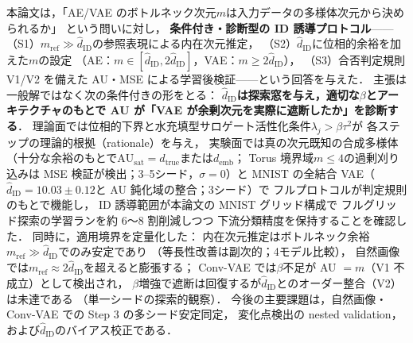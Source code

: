 \documentclass[11pt,a4paper]{jsarticle}
\newcommand{\hatdID}{\hat{d}_{\mathrm{ID}}}
\newcommand{\dtrue}{d_{\mathrm{true}}}
\newcommand{\AUsat}{\mathrm{AU}_{\mathrm{sat}}}
\newcommand{\demb}{d_{\mathrm{emb}}}
\begin{document}
本論文は，「AE/VAE のボトルネック次元$m$は入力データの多様体次元から決められるか」
という問いに対し，
\textbf{条件付き・診断型の ID 誘導プロトコル}——
（S1）$m_{\mathrm{ref}} \gg \hatdID$の参照表現による内在次元推定，
（S2）$\hatdID$に位相的余裕を加えた$m$の設定
（AE：$m \in [\hatdID, 2\hatdID]$，VAE：$m \geq 2\hatdID$），
（S3）合否判定規則 V1/V2 を備えた AU・MSE による学習後検証——という回答を与えた．
主張は一般解ではなく次の条件付きの形をとる：
\textbf{$\hatdID$は探索窓を与え，適切な$\beta$とアーキテクチャのもとで
AU が「VAE が余剰次元を実際に遮断したか」を診断する}．
理論面では位相的下界と水充填型サロゲート活性化条件$\lambda_j > \beta\tau^2$が
各ステップの理論的根拠（rationale）を与え，
実験面では真の次元既知の合成多様体
（十分な余裕のもとで$\AUsat = \dtrue$または$\demb$；
Torus 境界域$m \leq 4$の過剰刈り込みは MSE 検証が検出；3--5シード，$\sigma = 0$）と
MNIST の全結合 VAE（$\hatdID = 10.03 \pm 0.12$と AU 鈍化域の整合；3シード）で
フルプロトコルが判定規則のもとで機能し，
ID 誘導範囲が本論文の MNIST グリッド構成で
フルグリッド探索の学習ランを約 6〜8 割削減しつつ
下流分類精度を保持することを確認した．
同時に，適用境界を定量化した：
内在次元推定はボトルネック余裕$m_{\mathrm{ref}} \gg \hatdID$でのみ安定であり
（等長性改善は副次的；4モデル比較），
自然画像では$m_{\mathrm{ref}} \approx 2\hatdID$を超えると膨張する；
Conv-VAE では$\beta$不足が AU $= m$（V1 不成立）として検出され，
$\beta$増強で遮断は回復するが$\hatdID$とのオーダー整合（V2）は未達である
（単一シードの探索的観察）．
今後の主要課題は，自然画像・Conv-VAE での Step 3 の多シード安定同定，
変化点検出の nested validation，および$\hatdID$のバイアス校正である．
\end{document}
